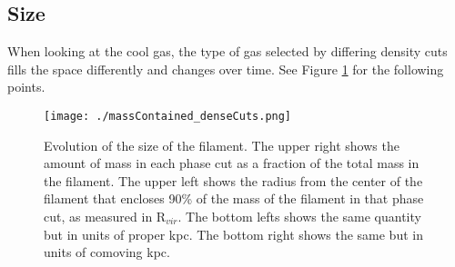 \documentclass{article}
\newcommand{\rvir}{R$_{vir}$}
\begin{document}
\subsection{Size}
When looking at the cool gas, the type of gas selected by differing density cuts
fills the space differently and changes over time. See Figure \ref{massInside}
for the following points. 

\begin{figure}[h]
\centering
\texttt{[image: ./massContained\_denseCuts.png]}
\caption{Evolution of the size of the filament. The upper right shows the amount
of mass in each phase cut as a fraction of the total mass in the filament. The
upper left shows the radius from the center of the filament that encloses 90\% of
the mass of the filament in that phase cut, as measured in \rvir. The bottom
lefts shows the same quantity but in units of proper kpc. The bottom right shows
the same but in units of comoving kpc.}
\label{massInside}
\end{figure}
\end{document}
